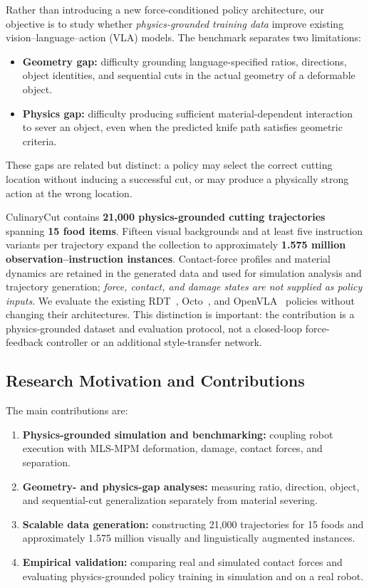 Rather than introducing a new force-conditioned policy architecture, our objective is to study whether \emph{physics-grounded training data} improve existing vision--language--action (VLA) models. The benchmark separates two limitations:
\begin{itemize}
  \item \textbf{Geometry gap:} difficulty grounding language-specified ratios, directions, object identities, and sequential cuts in the actual geometry of a deformable object.
  \item \textbf{Physics gap:} difficulty producing sufficient material-dependent interaction to sever an object, even when the predicted knife path satisfies geometric criteria.
\end{itemize}
These gaps are related but distinct: a policy may select the correct cutting location without inducing a successful cut, or may produce a physically strong action at the wrong location.

CulinaryCut contains \textbf{21,000 physics-grounded cutting trajectories} spanning \textbf{15 food items}. Fifteen visual backgrounds and at least five instruction variants per trajectory expand the collection to approximately \textbf{1.575 million observation--instruction instances}. Contact-force profiles and material dynamics are retained in the generated data and used for simulation analysis and trajectory generation; \emph{force, contact, and damage states are not supplied as policy inputs}. We evaluate the existing RDT~\citep{liu2025rdt1bdiffusionfoundationmodel}, Octo~\citep{mees2024octo}, and OpenVLA~\citep{openvla} policies without changing their architectures. This distinction is important: the contribution is a physics-grounded dataset and evaluation protocol, not a closed-loop force-feedback controller or an additional style-transfer network.

\subsection{Research Motivation and Contributions}
\label{subsec:cut_motivation}

The main contributions are:
\begin{enumerate}
  \item \textbf{Physics-grounded simulation and benchmarking:} coupling robot execution with MLS-MPM deformation, damage, contact forces, and separation.
  \item \textbf{Geometry- and physics-gap analyses:} measuring ratio, direction, object, and sequential-cut generalization separately from material severing.
  \item \textbf{Scalable data generation:} constructing 21,000 trajectories for 15 foods and approximately 1.575 million visually and linguistically augmented instances.
  \item \textbf{Empirical validation:} comparing real and simulated contact forces and evaluating physics-grounded policy training in simulation and on a real robot.
\end{enumerate}

